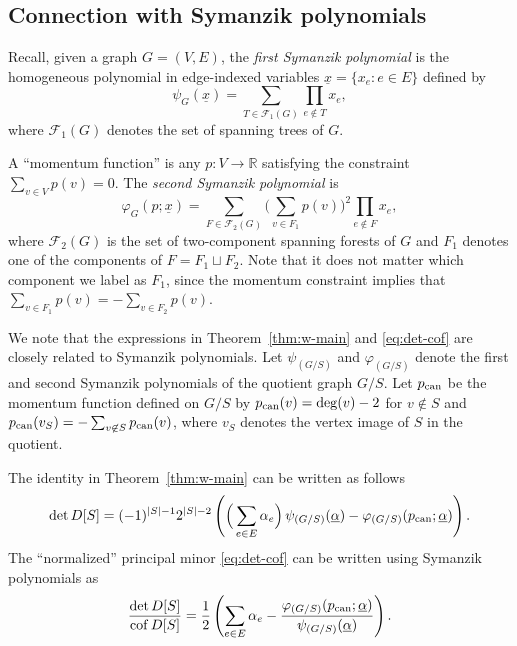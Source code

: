 \documentclass[12pt]{amsart}
\theoremstyle{definition}
\newcommand{\RR}{\mathbb{R}}
\DeclareMathOperator{\cof}{cof}
\newcommand{\trees}{\mathcal{F}_1}
\newcommand{\forests}{\mathcal{F}}
\begin{document}
	

\subsection{Connection with Symanzik polynomials}\label{sec:symanzik}
Recall, given a graph $G = (V, E)$, the {\em first Symanzik polynomial} is the homogeneous polynomial in edge-indexed variables $\underline{x} = \{x_e \colon e \in E\}$ defined by
\[
	\psi_G(\underline{x}) = \sum_{T \in \trees(G)} \prod_{e \not \in T} x_e ,
\]
where $\trees(G)$ denotes the set of spanning trees of $G$.

A ``momentum function'' is any $p\colon V \to \RR$ satisfying the constraint $\sum_{v \in V} p(v) = 0$. 
The {\em second Symanzik polynomial} is
\[
	\varphi_G(p; \underline{x}) = \sum_{F \in \forests_2(G)} \Big(\sum_{v \in F_1} p(v) \Big)^2 \prod_{e \not\in F} x_e ,
\]
where $\forests_2(G)$ is the set of two-component spanning forests of $G$ and $F_1$ denotes one of the components of $F = F_1 \sqcup F_2$.
Note that it does not matter which component we label as $F_1$, since the momentum constraint implies that
$\sum_{v \in F_1} p(v)  = - \sum_{v \in F_2} p(v)$.


We note that the expressions in Theorem~\ref{thm:w-main} and \eqref{eq:det-cof} are closely related to Symanzik polynomials.
Let $\psi_{(G/S)}$ and $\varphi_{(G/S)}$ denote the first and second Symanzik polynomials of the quotient graph $G/S$.
Let $p_{\rm can}$ be the momentum function defined on $G/S$ by $p_{\rm can}(v) = \deg(v) - 2$ for $v \not \in S$ and $p_{\rm can}(v_S) = -\sum_{v \not\in S} p_{\rm can}(v)$, where $v_S$ denotes the vertex image of $S$ in the quotient.

The identity in Theorem~\ref{thm:w-main} can be written as follows
\begin{equation}\label{eq:det-symanzik}
	\det D[S] = (-1)^{|S|-1} 2^{|S|-2} \left( \Big(\sum_{e \in E}\alpha_e \Big)\, \psi_{(G/S)}(\underline{\alpha}) - \varphi_{(G/S)}(p_{\rm can}; \underline{\alpha}) \right) .
\end{equation}
The ``normalized'' principal minor \eqref{eq:det-cof} can be written using Symanzik polynomials as
\begin{equation}\label{eq:det-cof-symanzik}
	\frac{\det D[S]}{\cof D[S]} = \frac12 \left( \sum_{e \in E} \alpha_e - \frac{\varphi_{(G/S)}(p_{\rm can}; \underline{\alpha})}{\psi_{(G/S)}(\underline{\alpha})} \right) .
\end{equation}
\end{document}
